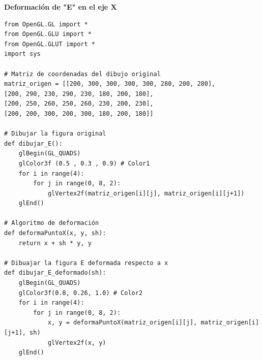 \documentclass[a4paper]{article}
\begin{document}
\Large{\textbf{Deformación de "E" en el eje X}}\\[-0.4cm]
\begin{center}
\begin{mycodeboxl}
\begin{lstlisting}
from OpenGL.GL import *
from OpenGL.GLU import *
from OpenGL.GLUT import *
import sys
 
# Matriz de coordenadas del dibujo original
matriz_origen = [[200, 300, 300, 300, 300, 280, 200, 280],
[200, 290, 230, 290, 230, 180, 200, 180],
[200, 250, 260, 250, 260, 230, 200, 230],
[200, 200, 300, 200, 300, 180, 200, 180]]
 
# Dibujar la figura original
def dibujar_E():
    glBegin(GL_QUADS)
    glColor3f (0.5 , 0.3 , 0.9) # Color1
    for i in range(4):
        for j in range(0, 8, 2):
            glVertex2f(matriz_origen[i][j], matriz_origen[i][j+1])
    glEnd()
 
# Algoritmo de deformación
def deformaPuntoX(x, y, sh):
    return x + sh * y, y
 
# Dibuajar la figura E deformada respecto a x
def dibujar_E_deformado(sh):
    glBegin(GL_QUADS)
    glColor3f(0.8, 0.26, 1.0) # Color2
    for i in range(4):
        for j in range(0, 8, 2):
            x, y = deformaPuntoX(matriz_origen[i][j], matriz_origen[i][j+1], sh)
            glVertex2f(x, y)
    glEnd()
\end{lstlisting}
\end{mycodeboxl}
\end{center}
\newpage
\end{document}
